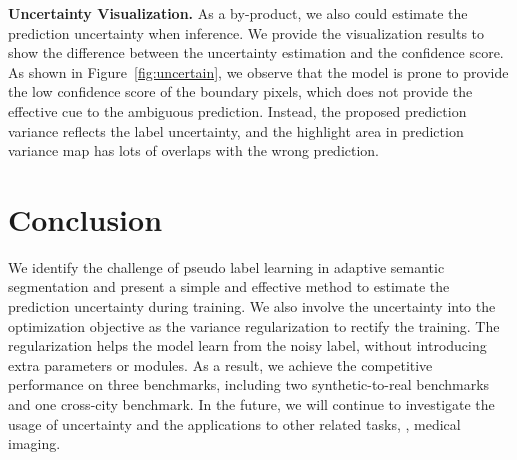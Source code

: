 \noindent\textbf{Uncertainty Visualization.} As a by-product, we also could estimate the prediction uncertainty when inference. We provide the visualization results to show the difference between the uncertainty estimation and the confidence score. As shown in Figure~\ref{fig:uncertain}, we observe that the model is prone to provide the low confidence score of the boundary pixels, which does not provide the effective cue to the ambiguous prediction. Instead, the proposed prediction variance reflects the label uncertainty, and the highlight area in prediction variance map has lots of overlaps with the wrong prediction.  

\section{Conclusion} \label{conclusion}
We identify the challenge of pseudo label learning in adaptive semantic segmentation and present a simple and effective method to estimate the prediction uncertainty during training. We also involve the uncertainty into the optimization objective as the variance regularization to rectify the training. The regularization helps the model learn from the noisy label, without introducing extra parameters or modules. As a result, we achieve the competitive performance on three benchmarks, including two synthetic-to-real benchmarks and one cross-city benchmark. In the future, we will continue to investigate the usage of uncertainty and the applications to other related tasks, \eg, medical imaging.

{\footnotesize


}


